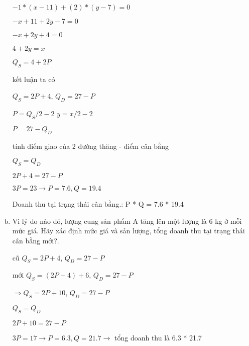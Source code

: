 \documentclass{report}
\begin{document}
\begin{enumerate}[(a)]
          $-1 * (x - 11) + (2) * (y - 7) = 0$

          $-x + 11 + 2y - 7 = 0$

          $-x + 2y + 4 = 0$

          $4 + 2y = x$

          $Q_S = 4 + 2P$



          kết luận
          ta có

          $Q_S = 2P + 4$,
          $Q_D = 27 - P$

          $P = Q_S / 2 - 2$ $y = x / 2 - 2$

          $P = 27 - Q_D$

          tính điểm giao của 2 đường thăng - điểm cân bằng

          $Q_S = Q_D$

          $2P + 4 = 27 - P$

          $3P = 23 \rightarrow P = 7.6, Q = 19.4$

          Doanh thu tại trạng thái cân bằng.:
          P * Q = 7.6 * 19.4



    \item Vì lý do nào đó, lượng cung sản phẩm A tăng lên một lượng là 6 kg ở mỗi mức giá. Hãy
          xác định mức giá và sản lượng, tổng doanh thu tại trạng thái cân bằng mới?.

          cũ
          $Q_S = 2P + 4$,
          $Q_D = 27 - P$

          mới
          $Q_S = (2P + 4) + 6$,
          $Q_D = 27 - P$

          $ \Rightarrow Q_S = 2P + 10$,
          $Q_D = 27 - P$

          $Q_S = Q_D$

          $2P + 10 = 27 - P$

          $3P = 17 \rightarrow P = 6.3, Q = 21.7 \rightarrow$ tổng doanh thu là 6.3 * 21.7


\end{enumerate}
\end{document}
